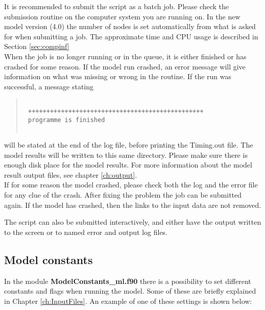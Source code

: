It is recommended to submit the script as a batch job. Please check the submission routine 
on the computer system you are running on. 
In the new model version (4.0) the number of nodes is set automatically from what is asked 
for when submitting a job. 
The approximate time and CPU usage is described in Section \ref{sec:compinf}\\

When the job is no longer running or in the queue, it is either finished or has crashed for some reason.  
If the model run crashed, an error message will give information on what was missing or wrong in the routine.  
If the run was successful, a message stating 
\begin{quote}
\begin{verbatim}

 ++++++++++++++++++++++++++++++++++++++++++++++++
 programme is finished


\end{verbatim}
\end{quote}
will be stated at the end of the log file, before printing the Timing.out file.   
The model results will be written to this same directory. Please make 
sure there is enough disk place for the model results. 
For more information about the model result output files, see chapter \ref{ch:output}.\\

If for some reason the model crashed, please check both the log and the error file for any 
clue of the crash. After fixing the problem the job can be submitted again. If the 
model has crashed, then the links to the input data are not removed. 

The script can also be submitted interactively, and either have the output written to the screen or to 
named error and output log files. 
 

\subsection{Model constants}

In the module {\bf ModelConstants\_ml.f90 } there is a possibility to set different 
constants and flags when running the model. 
Some of these are briefly explained in Chapter \ref{ch:InputFiles}. 
An example of one of these settings is shown below:

